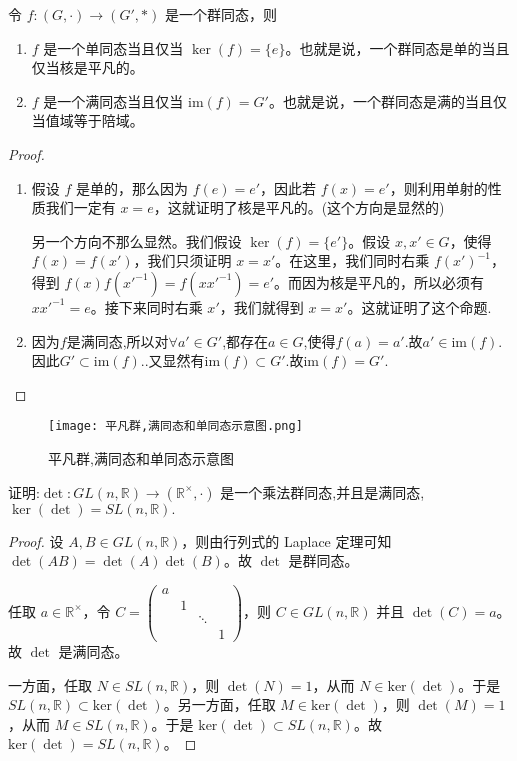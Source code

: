 \documentclass[../../main.tex]{subfiles}
\begin{document}
\begin{proposition}\label{proposition:一个群同态是单的当且仅当核是平凡的}
令 $f:(G,\cdot)\to (G',*)$ 是一个群同态，则
\begin{enumerate}
\item $f$ 是一个单同态当且仅当 $\ker(f)=\{e\}$。也就是说，一个群同态是单的当且仅当核是平凡的。

\item $f$ 是一个满同态当且仅当 $ \mathrm{im}(f)=G'$。也就是说，一个群同态是满的当且仅当值域等于陪域。
\end{enumerate}
\end{proposition}
\begin{proof}
\begin{enumerate}
\item 假设 $f$ 是单的，那么因为 $f(e)=e'$，因此若 $f(x)=e'$，则利用单射的性质我们一定有 $x = e$，这就证明了核是平凡的。(这个方向是显然的)

另一个方向不那么显然。我们假设 $\ker(f)=\{e'\}$。假设 $x,x'\in G$，使得 $f(x)=f(x')$，我们只须证明 $x = x'$。在这里，我们同时右乘 $f(x')^{-1}$，得到 $f(x)f(x'^{-1})=f(xx'^{-1})=e'$。而因为核是平凡的，所以必须有 $xx'^{-1}=e$。接下来同时右乘 $x'$，我们就得到 $x = x'$。这就证明了这个命题.

\item 因为$f$是满同态,所以对$\forall a'\in G'$,都存在$a\in G$,使得$f(a)=a'.$故$a'\in \mathrm{im}(f)$.因此$G' \subset \mathrm{im}(f).$.又显然有$\mathrm{im}(f) \subset G'.$故$\mathrm{im}(f) = G'.$
\end{enumerate}
\end{proof}

\begin{figure}[H]
\centering
\texttt{[image: 平凡群,满同态和单同态示意图.png]}
\label{figure:平凡群,满同态和单同态示意图}
\caption{平凡群,满同态和单同态示意图}
\end{figure}


\begin{example}\label{example:行列是就是一个乘法群同态}
证明:$\det : GL(n, \mathbb{R}) \to (\mathbb{R}^\times, \cdot)$ 是一个乘法群同态,并且是满同态,$\ker (\det)=SL(n, \mathbb{R}).$
\end{example}
\begin{proof}
设 \(A, B \in GL(n, \mathbb{R})\)，则由行列式的 Laplace 定理可知 \(\det(AB) = \det(A)\det(B)\)。故 \(\det\) 是群同态。

任取 \(a \in \mathbb{R}^{\times}\)，令 \(C = \begin{pmatrix}
a & & & \\
& 1 & & \\
& & \ddots & \\
& & & 1
\end{pmatrix}\)，则 \(C \in GL(n, \mathbb{R})\) 并且 \(\det(C) = a\)。故 \(\det\) 是满同态。

一方面，任取 \(N \in SL(n, \mathbb{R})\)，则 \(\det(N) = 1\)，从而 \(N \in \mathrm{ker}(\det)\)。于是 \(SL(n, \mathbb{R}) \subset \mathrm{ker}(\det)\)。另一方面，任取 \(M \in \mathrm{ker}(\det)\)，则 \(\det(M) = 1\)，从而 \(M \in SL(n, \mathbb{R})\)。于是 \(\mathrm{ker}(\det) \subset SL(n, \mathbb{R})\)。故 \(\mathrm{ker}(\det) = SL(n, \mathbb{R})\)。 
\end{proof}
\end{document}
